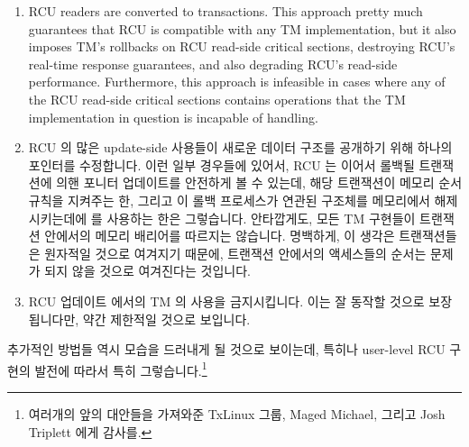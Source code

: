\begin{enumerate}
\item	RCU readers are converted to transactions.
	This approach pretty much guarantees that RCU is compatible with
	any TM implementation, but it also imposes TM's rollbacks on RCU
	read-side critical sections, destroying RCU's real-time response
	guarantees, and also degrading RCU's read-side performance.
	Furthermore, this approach is infeasible in cases where any of
	the RCU read-side critical sections contains operations that
	the TM implementation in question is incapable of handling.
\fi
\item	RCU 의 많은 update-side 사용들이 새로운 데이터 구조를 공개하기 위해
	하나의 포인터를 수정합니다.
	이런 일부 경우들에 있어서, RCU 는 이어서 롤백될 트랜잭션에 의핸 포니터
	업데이트를 안전하게 볼 수 있는데, 해당 트랜잭션이 메모리 순서 규칙을
	지켜주는 한, 그리고 이 롤백 프로세스가 연관된 구조체를 메모리에서
	해제시키는데에  를 사용하는 한은 그렇습니다.
	안타깝게도, 모든 TM 구현들이 트랜잭션 안에서의 메모리 배리어를 따르지는
	않습니다.
	명백하게, 이 생각은 트랜잭션들은 원자적일 것으로 여겨지기 때문에,
	트랜잭션 안에서의 액세스들의 순서는 문제가 되지 않을 것으로 여겨진다는
	것입니다.
\item	RCU 업데이트 에서의 TM 의 사용을 금지시킵니다.
	이는 잘 동작할 것으로 보장됩니다만, 약간 제한적일 것으로 보입니다.

\end{enumerate}

추가적인 방법들 역시 모습을 드러내게 될 것으로 보이는데, 특히나 user-level RCU
구현의 발전에 따라서 특히 그렇습니다.\footnote{
	여러개의 앞의 대안들을 가져와준 TxLinux 그룹, Maged Michael, 그리고
	Josh Triplett 에게 감사를.}


